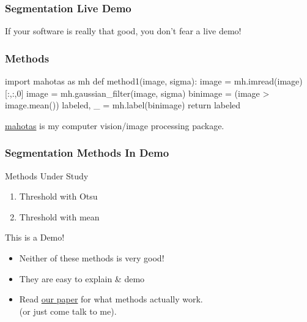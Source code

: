 \documentclass{beamer}
\begin{document}
\begin{frame}[fragile]
\frametitle{Segmentation Live Demo}

If your software is really that good, you don't fear a live demo!

\end{frame}

\begin{frame}[fragile]
\frametitle{Methods}

\begin{python}
import mahotas as mh
def method1(image, sigma):
    image = mh.imread(image)[:,:,0]
    image  = mh.gaussian_filter(image, sigma)
    binimage = (image > image.mean())
    labeled, _ = mh.label(binimage)
    return labeled
\end{python}

\href{http://luispedro.org/software/mahotas}{mahotas} is my \alert{computer vision/image processing} package.

\end{frame}

\begin{frame}[fragile]
\frametitle{Segmentation Methods In Demo}


\begin{block}{Methods Under Study}

\begin{enumerate}
\item Threshold with Otsu
\item Threshold with mean
\end{enumerate}

\end{block}

\pause

\begin{block}{This is a Demo!}

\begin{itemize}
\item Neither of these methods is very good!
\item They are easy to explain \& demo
\item Read \href{http://www.ncbi.nlm.nih.gov/pmc/articles/PMC2901896/}{our paper} for what methods actually work.\\
(or just come talk to me).
\end{itemize}

\end{block}

\end{frame}
\end{document}
